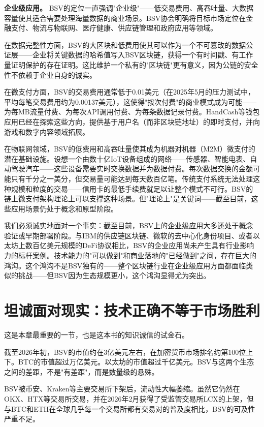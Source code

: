 \documentclass[a4paper,12pt,openany]{ctexbook}
\begin{document}
\textbf{企业级应用。} BSV的定位一直强调"企业级"——低交易费用、高吞吐量、大数据容量使其适合需要处理海量数据的商业场景。BSV协会明确将目标市场定位在金融支付、物流与物联网、医疗健康、供应链管理和政府应用等领域。

在数据完整性方面，BSV的大区块和低费用使其可以作为一个不可篡改的数据公证层——企业将关键数据的哈希值写入BSV区块链，获得一个有时间戳、有工作量证明保护的存在证明。这比维护一个私有的"区块链"更有意义，因为公链的安全性不依赖于企业自身的诚实。

在微支付方面，BSV的交易费用通常低于0.01美元（在2025年5月的压力测试中，平均每笔交易费用约为0.00137美元），这使得"按次付费"的商业模式成为可能——为每MB流量付费、为每次API调用付费、为每条数据记录付费。HandCash等钱包应用已经在探索这些方向，提供基于用户名（而非区块链地址）的即时支付，并向游戏和数字内容领域拓展。

在物联网领域，BSV的低费用和高吞吐量使其成为机器对机器（M2M）微支付的潜在基础设施。设想一个由数十亿IoT设备组成的网络——传感器、智能电表、自动驾驶汽车——这些设备需要实时交换数据并为数据付费。每次数据交换的金额可能只有千分之一美分，但交易量可能达到每天数百亿笔。传统支付系统无法处理这种规模和粒度的交易——信用卡的最低手续费就足以让整个模式不可行。BSV的链上微支付架构理论上可以支撑这种场景。但"理论上"是关键词——截至目前，这些应用场景仍处于概念和原型阶段。

我们必须诚实地面对一个事实：截至目前，BSV上的企业级应用大多还处于概念验证或早期部署阶段。与IBM的供应链区块链、微软的去中心化身份项目、或者以太坊上数百亿美元规模的DeFi协议相比，BSV的企业应用尚未产生具有行业影响力的标杆案例。技术能力的"可以做到"和商业落地的"已经做到"之间，存在巨大的鸿沟。这个鸿沟不是BSV独有的——整个区块链行业在企业级应用方面都面临类似的挑战——但BSV因为生态规模更小，这个鸿沟显得尤为突出。


\section*{坦诚面对现实：技术正确不等于市场胜利}


这是本章最重要的一节，也是这本书的知识诚信的试金石。

截至2026年初，BSV的市值约在3亿美元左右，在加密货币市场排名约第100位上下。BTC的市值超过万亿美元。以太坊的市值超过千亿美元。BSV与这两个生态之间的差距，不是"有差距"，而是数量级的悬殊。

BSV被币安、Kraken等主要交易所下架后，流动性大幅萎缩。虽然它仍然在OKX、HTX等交易所交易，并在2026年2月获得了受监管交易所LCX的上架，但与BTC和ETH在全球几乎每一个交易所都有交易对的普及度相比，BSV的可及性严重不足。
\end{document}
